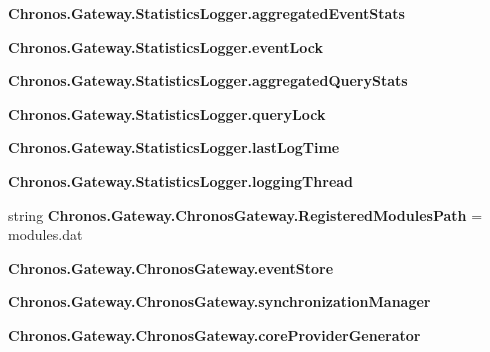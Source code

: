 \begin{DoxyCompactItemize}
\item 
{\bfseries Chronos.\+Gateway.\+Statistics\+Logger.\+aggregated\+Event\+Stats}\hypertarget{group__Chronos_ga990ca5eb9eade0007d1bbd0b3e203cf6}{}\label{group__Chronos_ga990ca5eb9eade0007d1bbd0b3e203cf6}

\item 
{\bfseries Chronos.\+Gateway.\+Statistics\+Logger.\+event\+Lock}\hypertarget{group__Chronos_gacccca454df540d4f65c8a0a6e06a2598}{}\label{group__Chronos_gacccca454df540d4f65c8a0a6e06a2598}

\item 
{\bfseries Chronos.\+Gateway.\+Statistics\+Logger.\+aggregated\+Query\+Stats}\hypertarget{group__Chronos_gaaf5e06d75e442531da1542a16e91244e}{}\label{group__Chronos_gaaf5e06d75e442531da1542a16e91244e}

\item 
{\bfseries Chronos.\+Gateway.\+Statistics\+Logger.\+query\+Lock}\hypertarget{group__Chronos_ga6493895682f89ba183a398d2d60b6059}{}\label{group__Chronos_ga6493895682f89ba183a398d2d60b6059}

\item 
{\bfseries Chronos.\+Gateway.\+Statistics\+Logger.\+last\+Log\+Time}\hypertarget{group__Chronos_ga1b0135a94397e5d0e48f11cad523ca2d}{}\label{group__Chronos_ga1b0135a94397e5d0e48f11cad523ca2d}

\item 
{\bfseries Chronos.\+Gateway.\+Statistics\+Logger.\+logging\+Thread}\hypertarget{group__Chronos_ga63f477af3ce11175e9d36910edf4df8a}{}\label{group__Chronos_ga63f477af3ce11175e9d36910edf4df8a}

\item 
string {\bfseries Chronos.\+Gateway.\+Chronos\+Gateway.\+Registered\+Modules\+Path} = \textquotesingle{}modules.\+dat\textquotesingle{}\hypertarget{group__Chronos_ga5bffb75642bed9ff060b2be34fe9a8c3}{}\label{group__Chronos_ga5bffb75642bed9ff060b2be34fe9a8c3}

\item 
{\bfseries Chronos.\+Gateway.\+Chronos\+Gateway.\+event\+Store}\hypertarget{group__Chronos_ga7eae9ca758b0f85454d14b6be6877f06}{}\label{group__Chronos_ga7eae9ca758b0f85454d14b6be6877f06}

\item 
{\bfseries Chronos.\+Gateway.\+Chronos\+Gateway.\+synchronization\+Manager}\hypertarget{group__Chronos_ga13567c124d44aed47fe0f97d3cb69fd8}{}\label{group__Chronos_ga13567c124d44aed47fe0f97d3cb69fd8}

\item 
{\bfseries Chronos.\+Gateway.\+Chronos\+Gateway.\+core\+Provider\+Generator}\hypertarget{group__Chronos_gaa752d4d2bdc594314673c0572551b973}{}\label{group__Chronos_gaa752d4d2bdc594314673c0572551b973}


\end{DoxyCompactItemize}
